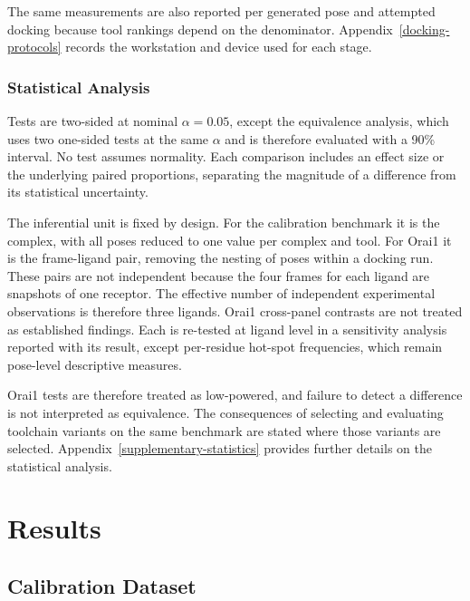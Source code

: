 The same measurements are also reported per generated pose and attempted docking because tool rankings depend on the denominator. Appendix~\ref{docking-protocols} records the workstation and device used for each stage.

\hypertarget{statistical-analysis}{%
\subsection{Statistical Analysis}\label{statistical-analysis}}

Tests are two-sided at nominal \ensuremath{\alpha = 0.05}, except the equivalence analysis, which uses two one-sided tests at the same \ensuremath{\alpha} and is therefore evaluated with a 90\% interval. No test assumes normality. Each comparison includes an effect size or the underlying paired proportions, separating the magnitude of a difference from its statistical uncertainty.

The inferential unit is fixed by design. For the calibration benchmark it is the complex, with all poses reduced to one value per complex and tool. For Orai1 it is the frame-ligand pair, removing the nesting of poses within a docking run. These pairs are not independent because the four frames for each ligand are snapshots of one receptor. The effective number of independent experimental observations is therefore three ligands. Orai1 cross-panel contrasts are not treated as established findings. Each is re-tested at ligand level in a sensitivity analysis reported with its result, except per-residue hot-spot frequencies, which remain pose-level descriptive measures.

Orai1 tests are therefore treated as low-powered, and failure to detect a difference is not interpreted as equivalence. The consequences of selecting and evaluating toolchain variants on the same benchmark are stated where those variants are selected. Appendix~\ref{supplementary-statistics} provides further details on the statistical analysis.

\hypertarget{results}{%
\chapter{Results}\label{results}}

\hypertarget{calibration-dataset-1}{%
\section{Calibration Dataset}\label{calibration-dataset-1}}

